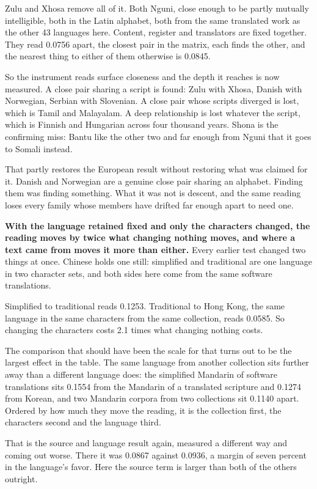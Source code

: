 Zulu and Xhosa remove all of it. Both Nguni, close enough to be partly mutually intelligible, both in the Latin alphabet, both from the same translated work as the other 43 languages here. Content, register and translators are fixed together. They read 0.0756 apart, the closest pair in the matrix, each finds the other, and the nearest thing to either of them otherwise is 0.0845.

So the instrument reads surface closeness and the depth it reaches is now measured. A close pair sharing a script is found: Zulu with Xhosa, Danish with Norwegian, Serbian with Slovenian. A close pair whose scripts diverged is lost, which is Tamil and Malayalam. A deep relationship is lost whatever the script, which is Finnish and Hungarian across four thousand years. Shona is the confirming miss: Bantu like the other two and far enough from Nguni that it goes to Somali instead.

That partly restores the European result without restoring what was claimed for it. Danish and Norwegian are a genuine close pair sharing an alphabet. Finding them was finding something. What it was not is descent, and the same reading loses every family whose members have drifted far enough apart to need one.

\textbf{With the language retained fixed and only the characters changed, the reading moves by twice what changing nothing moves, and where a text came from moves it more than either.} Every earlier test changed two things at once. Chinese holds one still: simplified and traditional are one language in two character sets, and both sides here come from the same software translations.

Simplified to traditional reads 0.1253. Traditional to Hong Kong, the same language in the same characters from the same collection, reads 0.0585. So changing the characters costs 2.1 times what changing nothing costs.

The comparison that should have been the scale for that turns out to be the largest effect in the table. The same language from another collection sits further away than a different language does: the simplified Mandarin of software translations sits 0.1554 from the Mandarin of a translated scripture and 0.1274 from Korean, and two Mandarin corpora from two collections sit 0.1140 apart. Ordered by how much they move the reading, it is the collection first, the characters second and the language third.

That is the source and language result again, measured a different way and coming out worse. There it was 0.0867 against 0.0936, a margin of seven percent in the language's favor. Here the source term is larger than both of the others outright.

